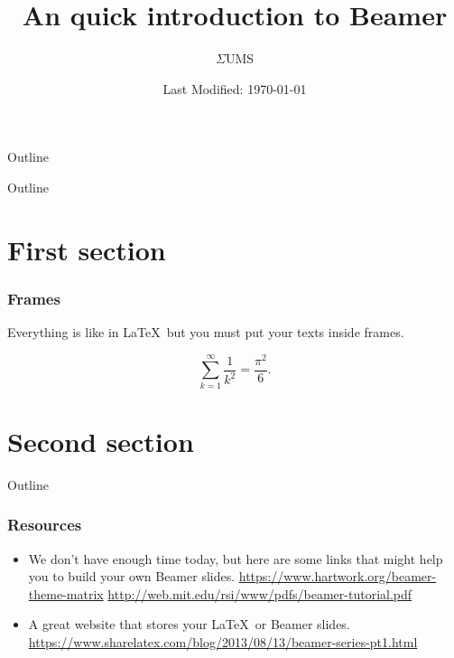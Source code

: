 \documentclass[10pt,a4paper,serif]{beamer}
\title{An quick introduction to Beamer}
\author{$\Sigma$UMS}
\institute{Sydney Universtiy Mathematics Society}
\date{Last Modified: \today}
\begin{document}
\begin{frame}
\maketitle
\end{frame}

\begin{frame}{Outline}
\tableofcontents
\end{frame}


\begin{frame}{Outline}
\tableofcontents[currentsection]
\end{frame}

\section{First section}
\begin{frame}
\frametitle{Frames}
Everything is like in \LaTeX\ but you must put your texts inside frames. 

\begin{equation}
\sum_{k=1}^{\infty} \frac{1}{k^2} = \frac{\pi^2}{6}.
\end{equation}
\end{frame}


\section{Second section}
\begin{frame}{Outline}
  \tableofcontents[currentsection]
\end{frame}


\begin{frame}
\frametitle{Resources}
\begin{itemize}
\item We don't have enough time today, but here are some links that might help you to build your own Beamer slides. 
\url{https://www.hartwork.org/beamer-theme-matrix}
\url{http://web.mit.edu/rsi/www/pdfs/beamer-tutorial.pdf}

\item A great website that stores your \LaTeX\ or Beamer slides. 
\url{https://www.sharelatex.com/blog/2013/08/13/beamer-series-pt1.html}
\end{itemize}
\end{frame}
\end{document}
